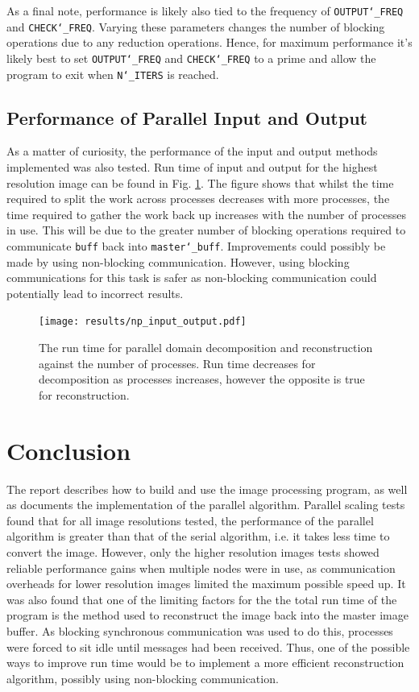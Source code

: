 \documentclass[11pt, a4paper]{article}
\begin{document}
			As a final note, performance is likely also tied to the frequency of \texttt{OUTPUT\char`_FREQ} and \texttt{CHECK\char`_FREQ}. Varying these parameters changes the number of blocking operations due to any reduction operations. Hence, for maximum performance it's likely best to set \texttt{OUTPUT\char`_FREQ} and \texttt{CHECK\char`_FREQ} to a prime and allow the program to exit when \texttt{N\char`_ITERS} is reached.
		
		\subsection{Performance of Parallel Input and Output}
			As a matter of curiosity, the performance of the input and output methods implemented was also tested. Run time of input and output for the highest resolution image can be found in Fig. \ref{fig:input_output}. The figure shows that whilst the time required to split the work across processes decreases with more processes, the time required to gather the work back up increases with the number of processes in use. This will be due to the greater number of blocking operations required to communicate \texttt{buff} back into \texttt{master\char`_buff}. Improvements could possibly be made by using non-blocking communication. However, using blocking communications for this task is safer as non-blocking communication could potentially lead to incorrect results. 
			
			\begin{figure}
				\centering
				\texttt{[image: results/np\_input\_output.pdf]}
				\caption{The run time for parallel domain decomposition and reconstruction against the number of processes. Run time decreases for decomposition as processes increases, however the opposite is true for reconstruction.}
				\label{fig:input_output}
			\end{figure}

	\section{Conclusion}
		The report describes how to build and use the image processing program, as well as documents the implementation of the parallel algorithm. Parallel scaling tests found that for all image resolutions tested, the performance of the parallel algorithm is greater than that of the serial algorithm, i.e. it takes less time to convert the image. However, only the higher resolution images tests showed reliable performance gains when multiple nodes were in use, as communication overheads for lower resolution images limited the maximum possible speed up. It was also found that one of the limiting factors for the the total run time of the program is the method used to reconstruct the image back into the master image buffer. As blocking synchronous communication was used to do this, processes were forced to sit idle until messages had been received. Thus, one of the possible ways to improve run time would be to implement a more efficient reconstruction algorithm, possibly using non-blocking communication.
		
\end{document}
